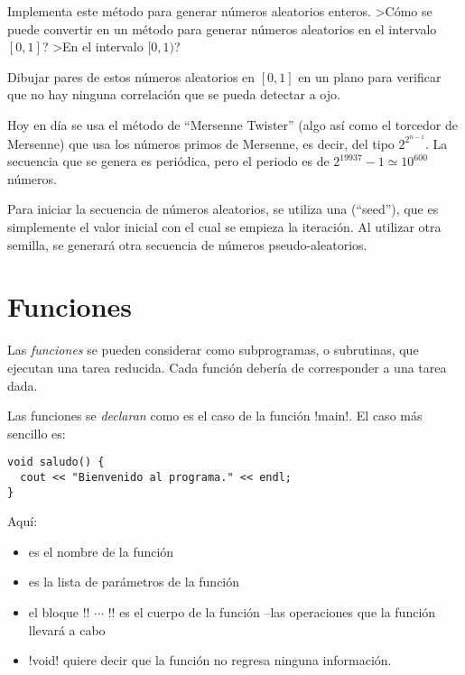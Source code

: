 \ejercicio
Implementa este método para generar números aleatorios enteros.
>Cómo se puede convertir en un método para generar números aleatorios en el
intervalo $[0,1]$? >En el intervalo $[0,1)$?

\ejercicio
Dibujar pares de estos números aleatorios en $[0,1]$ en un plano para verificar
que no hay ninguna correlación que se pueda detectar a ojo.






 Hoy en día se usa el método de ``Mersenne Twister''
(algo así como el torcedor de Mersenne) que usa los números primos de Mersenne,
es decir, del tipo $2^{2^{n-1}}$. La secuencia que se genera es periódica, pero
el periodo es de $2^{19937}-1 \simeq 10^{600}$ números. 

Para iniciar la
secuencia de números aleatorios, se utiliza una  (``seed''), que
es simplemente el 
valor inicial con el cual se empieza la iteración. Al utilizar otra semilla, se
generará otra secuencia de números pseudo-aleatorios.






\section{Funciones}

Las \emph{funciones} se pueden considerar como subprogramas, o subrutinas,  que
ejecutan una tarea reducida. Cada función debería de corresponder a una tarea
dada.

Las funciones se \emph{declaran} como es el caso de la función \inl!main!. El
caso más sencillo es:
\begin{lstlisting}
void saludo() {
  cout << "Bienvenido al programa." << endl;
}
\end{lstlisting}
Aquí:
\begin{itemize}
\item {} es el nombre de la función
\item \inl{()} es la lista de parámetros de la función
\item el bloque \inl!{! $\cdots$ \inl!}! es el cuerpo de la función --las
operaciones que la función llevará a cabo
\item \inl!void! quiere decir que la función no regresa ninguna información.
\end{itemize}

